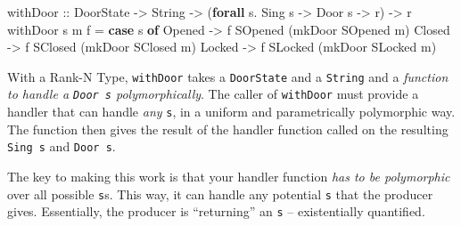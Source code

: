 \documentclass[]{article}
\newenvironment{Shaded}{}{}
\newcommand{\DataTypeTok}[1]{\textcolor[rgb]{0.56,0.13,0.00}{#1}}
\newcommand{\KeywordTok}[1]{\textcolor[rgb]{0.00,0.44,0.13}{\textbf{#1}}}
\newcommand{\NormalTok}[1]{#1}
\newcommand{\OperatorTok}[1]{\textcolor[rgb]{0.40,0.40,0.40}{#1}}
\newcommand{\OtherTok}[1]{\textcolor[rgb]{0.00,0.44,0.13}{#1}}
\newcommand{\StringTok}[1]{\textcolor[rgb]{0.25,0.44,0.63}{#1}}
\begin{document}
\begin{Shaded}
\begin{Highlighting}[]
\NormalTok{withDoor}
\OtherTok{    ::} \DataTypeTok{DoorState}
    \OtherTok{->} \DataTypeTok{String}
    \OtherTok{->}\NormalTok{ (}\KeywordTok{forall}\NormalTok{ s}\OperatorTok{.} \DataTypeTok{Sing}\NormalTok{ s }\OtherTok{->} \DataTypeTok{Door}\NormalTok{ s }\OtherTok{->}\NormalTok{ r)}
    \OtherTok{->}\NormalTok{ r}
\NormalTok{withDoor s m f }\OtherTok{=} \KeywordTok{case}\NormalTok{ s }\KeywordTok{of}
    \DataTypeTok{Opened} \OtherTok{->}\NormalTok{ f }\DataTypeTok{SOpened}\NormalTok{ (mkDoor }\DataTypeTok{SOpened}\NormalTok{ m)}
    \DataTypeTok{Closed} \OtherTok{->}\NormalTok{ f }\DataTypeTok{SClosed}\NormalTok{ (mkDoor }\DataTypeTok{SClosed}\NormalTok{ m)}
    \DataTypeTok{Locked} \OtherTok{->}\NormalTok{ f }\DataTypeTok{SLocked}\NormalTok{ (mkDoor }\DataTypeTok{SLocked}\NormalTok{ m)}
\end{Highlighting}
\end{Shaded}

With a Rank-N Type, \texttt{withDoor} takes a \texttt{DoorState} and a
\texttt{String} and a \emph{function to handle a \texttt{Door\ s}
polymorphically}. The caller of \texttt{withDoor} must provide a handler that
can handle \emph{any} \texttt{s}, in a uniform and parametrically polymorphic
way. The function then gives the result of the handler function called on the
resulting \texttt{Sing\ s} and \texttt{Door\ s}.

\begin{Shaded}
\end{Shaded}

The key to making this work is that your handler function \emph{has to be
polymorphic} over all possible \texttt{s}s. This way, it can handle any
potential \texttt{s} that the producer gives. Essentially, the producer is
``returning'' an \texttt{s} -- existentially quantified.
\end{document}
